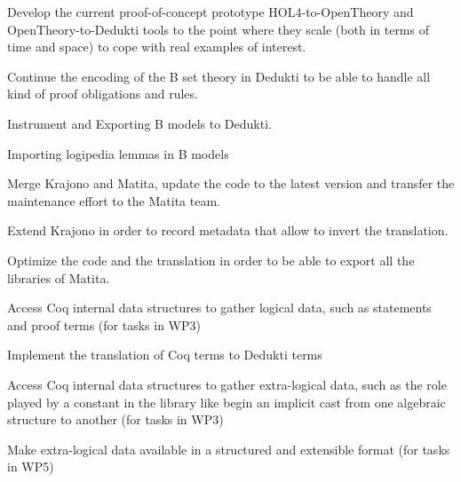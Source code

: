 \begin{workpackage}
\begin{tasklist}
\begin{task}[id=HOL4,
  title=Instrument HOL4,
  lead=Cha,
  ChaRM=20]
%
\begin{compactitem}
\item Develop the current proof-of-concept prototype
    HOL4-to-OpenTheory and OpenTheory-to-Dedukti tools to the point
    where they scale (both in terms of time and space) to cope with
    real examples of interest.
\end{compactitem}
\end{task}

\begin{task}[id=atelier-b,
  title=Instrument Atelier-B/Rodin,
  lead=Cle,
  CleRM=0, %
  ImtRM=0, %
  TouRM=0] %
%
\begin{compactitem}
\item Continue the encoding of the B set theory in Dedukti to be
  able to handle all kind of proof obligations and rules.
\item Instrument and Exporting B models to Dedukti.
\item Importing logipedia lemmas in B models
\end{compactitem}
\end{task}

\begin{task}[id=matita,
  title=Integrate the Matita translator in Matita itself,
  lead=Bol,
  BolRM=4]
%
\begin{compactitem}
\item Merge Krajono and Matita, update the code to the latest
  version and transfer the maintenance effort to the Matita team.
\item Extend Krajono in order to record metadata that allow to
  invert the translation.
\item Optimize the code and the translation in order to be able to
  export all the libraries of Matita.
\end{compactitem}
\end{task}

\begin{task}[id=coq,
  title=Instrument Coq,
  lead=Bol,
  BolRM=12,
  InrRM=0]  %
%
\begin{compactitem}
\item Access Coq internal data structures to gather logical data, such as
statements and proof terms (for tasks in WP3)
\item Implement the translation of Coq terms to Dedukti terms
\item Access Coq internal data structures to gather extra-logical data,
such as the role played by a constant in the library like begin an implicit
cast from one algebraic structure to another (for tasks in WP3)
\item Make extra-logical data available in a structured and
  extensible format (for tasks in WP5)
\end{compactitem}
\end{task}
\end{tasklist}


\end{workpackage}
